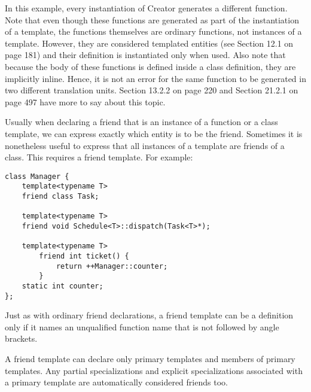 In this example, every instantiation of Creator generates a different function. Note that even though these functions are generated as part of the instantiation of a template, the functions themselves are ordinary functions, not instances of a template. However, they are considered templated entities (see Section 12.1 on page 181) and their definition is instantiated only when used. Also note that because the body of these functions is defined inside a class definition, they are implicitly inline. Hence, it is not an error for the same function to be generated in two different translation units. Section 13.2.2 on page 220 and Section 21.2.1 on page 497 have more to say about this topic.


Usually when declaring a friend that is an instance of a function or a class template, we can express exactly which entity is to be the friend. Sometimes it is nonetheless useful to express that all instances of a template are friends of a class. This requires a friend template. For example:

\begin{lstlisting}[style=styleCXX]
class Manager {
	template<typename T>
	friend class Task;
	
	template<typename T>
	friend void Schedule<T>::dispatch(Task<T>*);
	
	template<typename T>
		friend int ticket() {
			return ++Manager::counter;
		}
	static int counter;
};
\end{lstlisting}

Just as with ordinary friend declarations, a friend template can be a definition only if it names an unqualified function name that is not followed by angle brackets.

A friend template can declare only primary templates and members of primary templates. Any partial specializations and explicit specializations associated with a primary template are automatically considered friends too.








